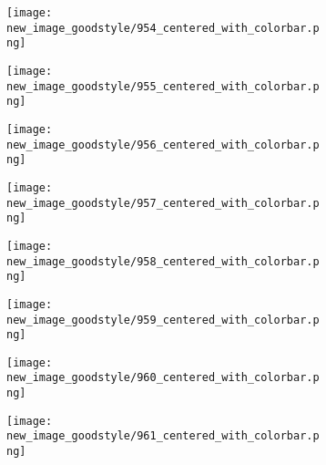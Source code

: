 \documentclass[a4paper,12pt]{article}
\begin{document}
\begin{figure}[H]
  \begin{subfigure}{0.11\textwidth}
    \texttt{[image: new\_image\_goodstyle/954\_centered\_with\_colorbar.png]}
  \end{subfigure}
  \hfill
  \begin{subfigure}{0.11\textwidth}
    \texttt{[image: new\_image\_goodstyle/955\_centered\_with\_colorbar.png]}
  \end{subfigure}
  \hfill
  \begin{subfigure}{0.11\textwidth}
    \texttt{[image: new\_image\_goodstyle/956\_centered\_with\_colorbar.png]}
  \end{subfigure}
  \hfill
  \begin{subfigure}{0.11\textwidth}
    \texttt{[image: new\_image\_goodstyle/957\_centered\_with\_colorbar.png]}
  \end{subfigure}
  \hfill
  \begin{subfigure}{0.11\textwidth}
    \texttt{[image: new\_image\_goodstyle/958\_centered\_with\_colorbar.png]}
  \end{subfigure}
  \hfill
  \begin{subfigure}{0.11\textwidth}
    \texttt{[image: new\_image\_goodstyle/959\_centered\_with\_colorbar.png]}
  \end{subfigure}
  \hfill
  \begin{subfigure}{0.11\textwidth}
    \texttt{[image: new\_image\_goodstyle/960\_centered\_with\_colorbar.png]}
  \end{subfigure}
  \hfill
  \begin{subfigure}{0.11\textwidth}
    \texttt{[image: new\_image\_goodstyle/961\_centered\_with\_colorbar.png]}
  \end{subfigure}
  \hfill
\end{figure}
\end{document}
